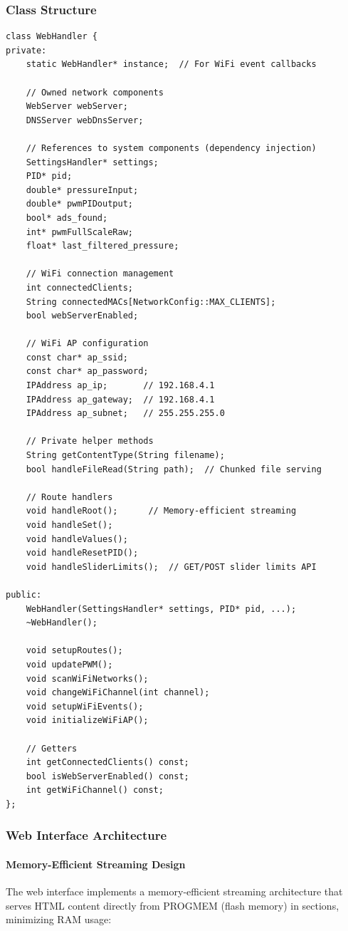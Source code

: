 \documentclass[12pt,a4paper]{article}
\begin{document}
\subsubsection{Class Structure}
\begin{lstlisting}[caption=WebHandler Class - Actual Implementation]
class WebHandler {
private:
    static WebHandler* instance;  // For WiFi event callbacks
    
    // Owned network components
    WebServer webServer;
    DNSServer webDnsServer;
    
    // References to system components (dependency injection)
    SettingsHandler* settings;
    PID* pid;
    double* pressureInput;
    double* pwmPIDoutput;
    bool* ads_found;
    int* pwmFullScaleRaw;
    float* last_filtered_pressure;
    
    // WiFi connection management
    int connectedClients;
    String connectedMACs[NetworkConfig::MAX_CLIENTS];
    bool webServerEnabled;
    
    // WiFi AP configuration
    const char* ap_ssid;
    const char* ap_password;
    IPAddress ap_ip;       // 192.168.4.1
    IPAddress ap_gateway;  // 192.168.4.1
    IPAddress ap_subnet;   // 255.255.255.0
    
    // Private helper methods
    String getContentType(String filename);
    bool handleFileRead(String path);  // Chunked file serving
    
    // Route handlers
    void handleRoot();      // Memory-efficient streaming
    void handleSet();
    void handleValues();
    void handleResetPID();
    void handleSliderLimits();  // GET/POST slider limits API
    
public:
    WebHandler(SettingsHandler* settings, PID* pid, ...);
    ~WebHandler();
    
    void setupRoutes();
    void updatePWM();
    void scanWiFiNetworks();
    void changeWiFiChannel(int channel);
    void setupWiFiEvents();
    void initializeWiFiAP();
    
    // Getters
    int getConnectedClients() const;
    bool isWebServerEnabled() const;
    int getWiFiChannel() const;
};
\end{lstlisting}

\subsubsection{Web Interface Architecture}

\paragraph{Memory-Efficient Streaming Design}
The web interface implements a memory-efficient streaming architecture that serves HTML content directly from PROGMEM (flash memory) in sections, minimizing RAM usage:
\end{document}
